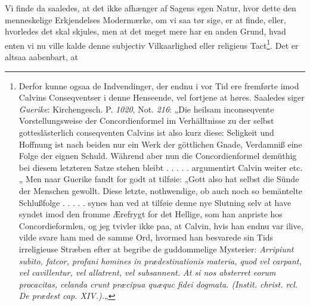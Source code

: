 \documentclass[12pt]{book}
\begin{document}
Vi finde da saaledes, at det ikke afhænger af Sagens egen Natur, hvor dette den
menneskelige Erkjendelses Modermærke, om vi saa tør sige, er at finde, eller,
hvorledes det skal skjules, men at det meget mere har en anden Grund, hvad enten
vi nu ville kalde denne subjectiv Vilkaarlighed eller religieus
Tact\footnote{Derfor kunne ogsaa de Indvendinger, der endnu i vor Tid ere
fremførte imod Calvins Conseqventser i denne Henseende, vel fortjene at høres.
Saaledes siger \emph{Guerike}: Kirchengesch. P. \textit{1020}, Not.
\textit{216}: „Die heilsam inconseqvente Vorstellungsweise der Concordienformel
im Verhälltnisse zu der selbst gotteslästerlich conseqventen Calvins ist also
kurz diese: Seligkeit und Hoffnung ist nach beiden nur ein Werk der göttlichen
Gnade, Verdamniß eine Folge der eignen Schuld. Während aber nun die
Concordienformel demüthig bei diesem letzteren Satze stehen bleibt . . . . .
argumentirt Calvin weiter etc.„ Men naar Guerike fandt for godt at tilføie:
„Gott also hat selbst die Sünde der Menschen gewollt. Diese letzte,
nothwendige, ob auch noch so bemäntelte Schlußfolge . . . . . synes han ved at
tilføie denne nye Slutning selv at have syndet imod den fromme Ærefrygt for det
Hellige, som han anpriste hos Concordieformlen, og jeg tvivler ikke paa, at
Calvin, hvis han endnu var ilive, vilde svare ham med de samme Ord, hvormed han
besvarede sin Tids irreligieuse Stræben efter at begribe de guddommelige
Mysterier: \textit{Arripiunt subito, fatcor, profani homines in prædestinationis
materia, quod vel carpant, vel cavillentur, vel allatrent, vel subsannent. At si
nos absterret eorum procacitas, celanda crunt præcipua quæquc fidei dogmata.
(Instit. christ. rcl. De prædest cap. XIV.).}„}. Det er altsaa aabenbart, at
\end{document}
